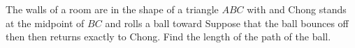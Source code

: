The walls of a room are in the shape of a triangle $ABC$ with   and   Chong stands at the midpoint of $BC$ and rolls a ball toward   Suppose that the ball bounces off  then  then returns exactly to Chong.  Find the length of the path of the ball.